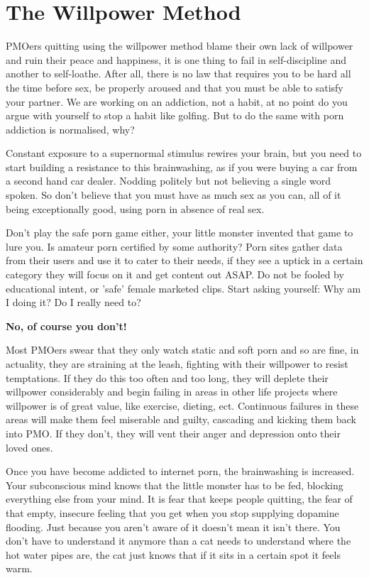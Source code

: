 \documentclass[easypeasy.tex]{subfiles}
\begin{document}
\section{The Willpower Method}
PMOers quitting using the willpower method blame their own lack of willpower and ruin their peace and happiness, it is one thing to fail in self-discipline and another to self-loathe. After all, there is no law that requires you to be hard all the time before sex, be properly aroused and that you must be able to satisfy your partner. We are working on an addiction, not a habit, at no point do you argue with yourself to stop a habit like golfing. But to do the same with porn addiction is normalised, why?

Constant exposure to a supernormal stimulus rewires your brain, but you need to start building a resistance to this brainwashing, as if you were buying a car from a second hand car dealer. Nodding politely but not believing a single word spoken. So don't believe that you must have as much sex as you can, all of it being exceptionally good, using porn in absence of real sex.

Don't play the safe porn game either, your little monster invented that game to lure you. Is amateur porn certified by some authority? Porn sites gather data from their users and use it to cater to their needs, if they see a uptick in a certain category they will focus on it and get content out ASAP. Do not be fooled by educational intent, or 'safe' female marketed clips. Start asking yourself:
  Why am I doing it?
  Do I really need to?

\textbf{No, of course you don't!}

Most PMOers swear that they only watch static and soft porn and so are fine, in actuality, they are straining at the leash, fighting with their willpower to resist temptations. If they do this too often and too long, they will deplete their willpower considerably and begin failing in areas in other life projects where willpower is of great value, like exercise, dieting, ect. Continuous failures in these areas will make them feel miserable and guilty, cascading and kicking them back into PMO. If they don't, they will vent their anger and depression onto their loved ones.

Once you have become addicted to internet porn, the brainwashing is increased. Your subconscious mind knows that the little monster has to be fed, blocking everything else from your mind. It is fear that keeps people quitting, the fear of that empty, insecure feeling that you get when you stop supplying dopamine flooding. Just because you aren't aware of it doesn't mean it isn't there. You don't have to understand it anymore than a cat needs to understand where the hot water pipes are, the cat just knows that if it sits in a certain spot it feels warm.
\end{document}

